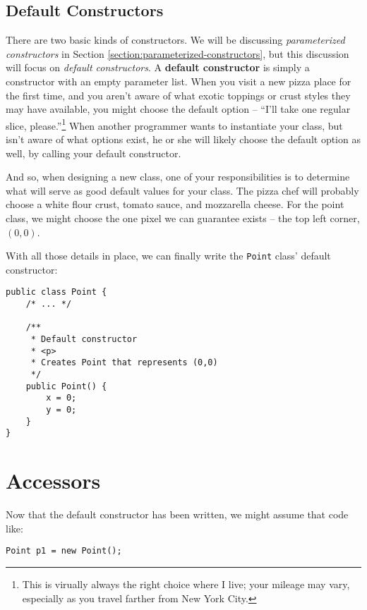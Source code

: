 \subsection{Default Constructors}

There are two basic kinds of constructors.  We will be discussing \textit{parameterized constructors} in Section \ref{section:parameterized-constructors}, but this discussion will focus on \textit{default constructors}.  A \textbf{default constructor} is simply a constructor with an empty parameter list.  When you visit a new pizza place for the first time, and you aren't aware of what exotic toppings or crust styles they may have available, you might choose the default option -- ``I'll take one regular slice, please.''\footnote{This is virually always the right choice where I live; your mileage may vary, especially as you travel farther from New York City.}  When another programmer wants to instantiate your class, but isn't aware of what options exist, he or she will likely choose the default option as well, by calling your default constructor.

And so, when designing a new class, one of your responsibilities is to determine what will serve as good default values for your class.  The pizza chef will probably choose a white flour crust, tomato sauce, and mozzarella cheese.  For the point class, we might choose the one pixel we can guarantee exists -- the top left corner, $(0,0)$.

With all those details in place, we can finally write the \texttt{Point} class' default constructor:

\begin{verbatim}
public class Point {
    /* ... */

    /**
     * Default constructor
     * <p>
     * Creates Point that represents (0,0)
     */
    public Point() {
        x = 0;
        y = 0;
    }
}
\end{verbatim}

\section{Accessors}

Now that the default constructor has been written, we might assume that code like:

\begin{verbatim}
Point p1 = new Point();
\end{verbatim}

